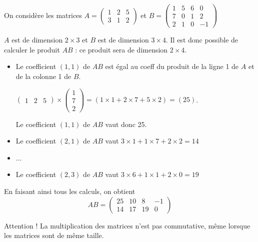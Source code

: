 \documentclass[11pt,fleqn]{book} %
\begin{document}
\begin{center}
\end{center}


\begin{example}On considère les matrices $A=\begin{pmatrix} 1 & 2 & 5 \\
3 & 1 & 2
\end{pmatrix}$ et $B=\begin{pmatrix}
1 & 5 & 6 & 0\\
7 & 0 & 1 & 2\\
2 & 1 & 0 & -1
\end{pmatrix}$

$A$ est de dimension $2 \times 3$ et $B$ est de dimension $3 \times 4$. Il est donc possible de calculer le produit $AB$ : ce produit sera de dimension $2 \times 4$.

\begin{itemize}
\item Le coefficient $(1,1)$ de $AB$ est égal au coeff du produit de la ligne 1 de $A$ et de la colonne 1 de $B$.

$\begin{pmatrix} 1 & 2 & 5 \end{pmatrix} \times \begin{pmatrix}
1 \\ 7 \\ 2
\end{pmatrix} = ( 1 \times 1 + 2 \times 7 + 5 \times 2) = (25)$.

Le coefficient $(1,1)$ de $AB$ vaut donc 25.
\item Le coefficient $(2,1)$ de $AB$ vaut $3 \times 1 + 1 \times 7 + 2 \times 2 = 14$
\item $\dots$
\item Le coefficient $(2,3)$ de $AB$ vaut $3 \times 6 + 1 \times 1 + 2 \times 0 = 19$
\end{itemize}

En faisant ainsi tous les calculs, on obtient
\[AB = \begin{pmatrix} 25 & 10 & 8 & -1 \\ 14 & 17 & 19 & 0 \end{pmatrix}\]
\end{example}



\begin{remark}Attention ! La multiplication des matrices n'est pas commutative, même lorsque les matrices sont de même taille.\end{remark}
\end{document}
